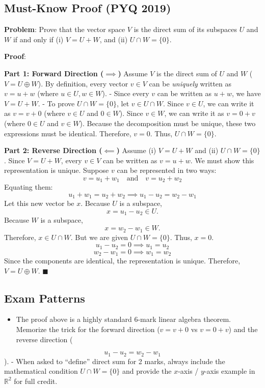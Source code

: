 \documentclass[
]{article}
\providecommand{\tightlist}{%
  \setlength{\itemsep}{0pt}\setlength{\parskip}{0pt}}
\begin{document}
\subsection{Must-Know Proof (PYQ 2019)}\label{must-know-proof-pyq-2019}

\textbf{Problem}: Prove that the vector space \(V\) is the direct sum of
its subspaces \(U\) and \(W\) if and only if (i) \(V = U + W\), and (ii)
\(U \cap W = \lbrace 0\rbrace\).

\textbf{Proof}:

\textbf{Part 1: Forward Direction (\(\implies\))} Assume \(V\) is the
direct sum of \(U\) and \(W\) (\(V = U \oplus W\)). By definition, every
vector \(v \in V\) can be \emph{uniquely} written as \(v = u + w\)
(where \(u \in U, w \in W\)). - Since every \(v\) can be written as
\(u+w\), we have \(V = U + W\). - To prove
\(U \cap W = \lbrace 0\rbrace\), let \(v \in U \cap W\). Since
\(v \in U\), we can write it as \(v = v + 0\) (where \(v \in U\) and
\(0 \in W\)). Since \(v \in W\), we can write it as \(v = 0 + v\) (where
\(0 \in U\) and \(v \in W\)). Because the decomposition must be unique,
these two expressions must be identical. Therefore, \(v = 0\). Thus,
\(U \cap W = \lbrace 0\rbrace\).

\textbf{Part 2: Reverse Direction (\(\impliedby\))} Assume (i)
\(V = U + W\) and (ii) \(U \cap W = \lbrace 0\rbrace\). Since
\(V = U + W\), every \(v \in V\) can be written as \(v = u + w\). We
must show this representation is unique. Suppose \(v\) can be
represented in two ways:
\[
v = u_1 + w_1 \quad \text{and} \quad v = u_2 + w_2
\]
Equating them:
\[
u_1 + w_1 = u_2 + w_2 \implies u_1 - u_2 = w_2 - w_1
\]
Let this new vector be \(x\). Because \(U\) is a subspace,
\[
x = u_1 - u_2 \in U.
\]
Because \(W\) is a subspace,
\[
x = w_2 - w_1 \in W.
\]
Therefore, \(x \in U \cap W\). But we are given
\(U \cap W = \lbrace 0\rbrace\). Thus, \(x = 0\).
\[
u_1 - u_2 = 0 \implies u_1 = u_2
\]
\[
w_2 - w_1 = 0 \implies w_1 = w_2
\]
Since the components are identical, the representation is unique.
Therefore, \(V = U \oplus W\). \(\blacksquare\)

\subsection{Exam Patterns}\label{exam-patterns-31}

\begin{itemize}
\tightlist
\item
  The proof above is a highly standard 6-mark linear algebra theorem.
  Memorize the trick for the forward direction (\(v=v+0\) vs \(v=0+v\))
  and the reverse direction (
\end{itemize}
\[
u_1-u_2 = w_2-w_1
\]
). - When asked to ``define'' direct sum for 2 marks, always include the
mathematical condition \(U \cap W = \lbrace 0\rbrace\) and provide the
\(x\)-axis / \(y\)-axis example in \(\mathbb{R}^2\) for full credit.
\end{document}

